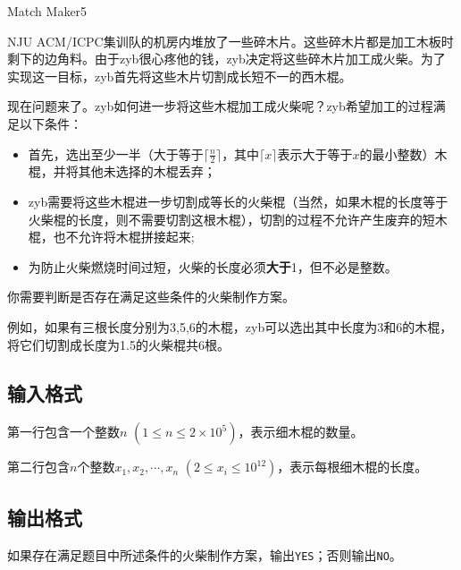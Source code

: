 \begin{Problem}{Match Maker}{5}

NJU ACM/ICPC集训队的机房内堆放了一些碎木片。这些碎木片都是加工木板时剩下的边角料。由于zyb很心疼他的钱，zyb决定将这些碎木片加工成火柴。为了实现这一目标，zyb首先将这些木片切割成长短不一的西木棍。

现在问题来了。zyb如何进一步将这些木棍加工成火柴呢？zyb希望加工的过程满足以下条件：

\begin{itemize}
\item 首先，选出至少一半（大于等于$\lceil \frac{n}{2} \rceil$，其中$\lceil x \rceil$表示大于等于$x$的最小整数）木棍，并将其他未选择的木棍丢弃；
\item zyb需要将这些木棍进一步切割成等长的火柴棍（当然，如果木棍的长度等于火柴棍的长度，则不需要切割这根木棍），切割的过程不允许产生废弃的短木棍，也不允许将木棍拼接起来;
\item 为防止火柴燃烧时间过短，火柴的长度必须\textbf{大于}1，但不必是整数。
\end{itemize}

你需要判断是否存在满足这些条件的火柴制作方案。

例如，如果有三根长度分别为3,5,6的木棍，zyb可以选出其中长度为3和6的木棍，将它们切割成长度为1.5的火柴棍共6根。

\subsection*{输入格式}

第一行包含一个整数$n$ $(1 \leq n \leq 2 \times 10^5)$，表示细木棍的数量。

第二行包含$n$个整数$x_1, x_2, \cdots, x_n$ $(2 \leq x_i \leq 10^{12})$，表示每根细木棍的长度。

\subsection*{输出格式}

如果存在满足题目中所述条件的火柴制作方案，输出\texttt{YES}；否则输出\texttt{NO}。


\end{Problem}

